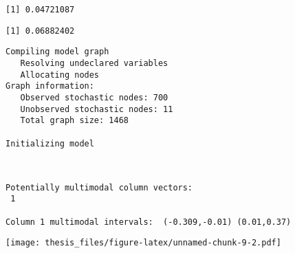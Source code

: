 \documentclass[12pt,twoside]{dukestatscithesis}
\theoremstyle{definition}
\theoremstyle{definition}
\theoremstyle{definition}
\theoremstyle{remark}
\begin{document}
\begin{verbatim}
[1] 0.04721087
\end{verbatim}
\begin{Shaded}
\begin{Highlighting}[]
\OperatorTok{$}\OperatorTok{$}\OperatorTok{$}
\end{Highlighting}
\end{Shaded}
\begin{verbatim}
[1] 0.06882402
\end{verbatim}
\begin{Shaded}
\begin{Highlighting}[]
\StringTok{ }\NormalTok{(}
                    \NormalTok{, }\NormalTok{(}\NormalTok{, }\NormalTok{, }\NormalTok{,}\NormalTok{),}
\end{Highlighting}
\end{Shaded}
\begin{verbatim}
Compiling model graph
   Resolving undeclared variables
   Allocating nodes
Graph information:
   Observed stochastic nodes: 700
   Unobserved stochastic nodes: 11
   Total graph size: 1468

Initializing model
\end{verbatim}
\begin{Shaded}
\begin{Highlighting}[]
\OperatorTok{$}\OperatorTok{$}\OperatorTok{$}
\end{Highlighting}
\end{Shaded}
\begin{verbatim}


Potentially multimodal column vectors:
 1 

Column 1 multimodal intervals:  (-0.309,-0.01) (0.01,0.37) 
\end{verbatim}
\texttt{[image: thesis\_files/figure-latex/unnamed-chunk-9-2.pdf]}
\end{document}
